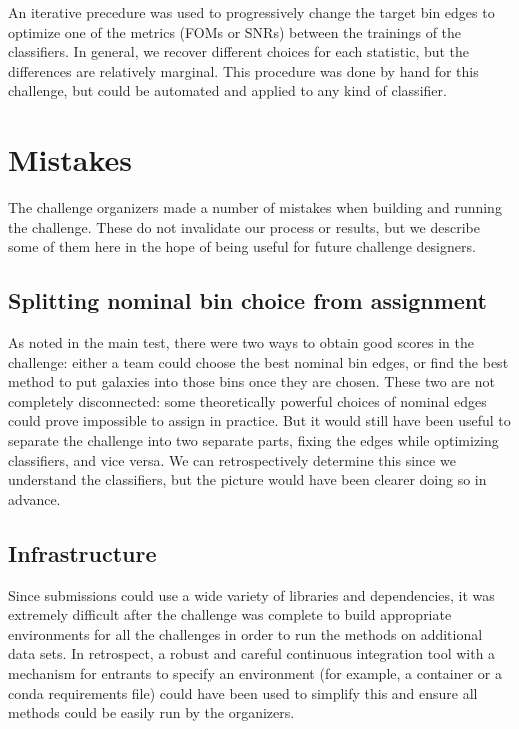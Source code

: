 \documentclass[twocolumn,twocolappendix]{aastex63}
\begin{document}
An iterative precedure was used to progressively change the target bin edges to optimize one of the metrics (FOMs or SNRs) between the trainings of the classifiers. In general, we recover different choices for each statistic, but the differences are relatively marginal. This procedure was done by hand for this challenge, but could be automated and applied to any kind of classifier.



\section{Mistakes} \label{sec:mistakes}
The challenge organizers made a number of mistakes when building and running the challenge.
These do not invalidate our process or results, but we describe some of them here in the hope of
being useful for future challenge designers.

\subsection{Splitting nominal bin choice from assignment}
As noted in the main test, there were two ways to obtain good scores in the challenge: 
either a team could choose the best
nominal bin edges, or find the best method to put galaxies into those bins once they are chosen.
These two are not completely disconnected: some theoretically powerful choices of nominal edges
could prove impossible to assign in practice.  But it would still have been useful to separate
the challenge into two separate parts, fixing the edges while optimizing classifiers, and vice
versa.   We can retrospectively determine this since we understand the classifiers, but the picture
would have been clearer doing so in advance.

\subsection{Infrastructure}
Since submissions could use a wide variety of libraries and dependencies, it was extremely
difficult after the challenge was complete to build appropriate environments for all the challenges
in order to run the methods on additional data sets. In retrospect, a robust and careful
continuous integration tool with a mechanism for entrants to specify an environment (for example, a 
container or a {\sc conda} requirements file) could have been used to simplify this and ensure
all methods could be easily run by the organizers.
\end{document}
